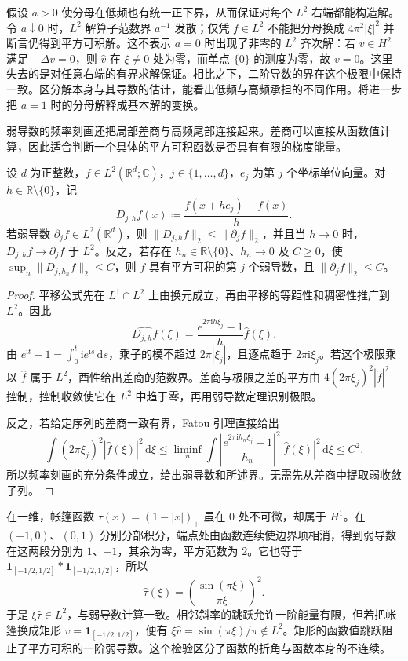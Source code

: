 假设 \(a>0\) 使分母在低频也有统一正下界，从而保证对每个 \(L^2\) 右端都能构造解。令 \(a\downarrow0\) 时，\(L^2\) 解算子范数界 \(a^{-1}\) 发散；仅凭 \(f\in L^2\) 不能把分母换成 \(4\pi^2|\xi|^2\) 并断言仍得到平方可积解。这不表示 \(a=0\) 时出现了非零的 \(L^2\) 齐次解：若 \(v\in H^2\) 满足 \(-\Delta v=0\)，则 \(\widehat v\) 在 \(\xi\ne0\) 处为零，而单点 \(\{0\}\) 的测度为零，故 \(v=0\)。这里失去的是对任意右端的有界求解保证。相比之下，二阶导数的界在这个极限中保持一致。区分解本身与其导数的估计，能看出低频与高频承担的不同作用。将进一步把 \(a=1\) 时的分母解释成基本解的变换。

\ProseParagraphBreak

弱导数的频率刻画还把局部差商与高频尾部连接起来。差商可以直接从函数值计算，因此适合判断一个具体的平方可积函数是否具有有限的梯度能量。

\begin{proposition}[平方范数差商]\label{b2:prop:04-difference-quotients}
设 \(d\) 为正整数，\(f\in L^2(\mathbb R^d;\mathbb C)\)，\(j\in\{1,\ldots,d\}\)，\(e_j\) 为第 \(j\) 个坐标单位向量。对 \(h\in\mathbb R\setminus\{0\}\)，记
\[
 D_{j,h}f(x)\coloneqq\frac{f(x+he_j)-f(x)}h.
\]
若弱导数 \(\partial_jf\in L^2(\mathbb R^d)\)，则 \(\|D_{j,h}f\|_2\leq\|\partial_jf\|_2\)，并且当 \(h\to0\) 时，\(D_{j,h}f\to\partial_jf\) 于 \(L^2\)。反之，若存在 \(h_n\in\mathbb R\setminus\{0\}\)、\(h_n\to0\) 及 \(C\geq0\)，使 \(\sup_n\|D_{j,h_n}f\|_2\leq C\)，则 \(f\) 具有平方可积的第 \(j\) 个弱导数，且 \(\|\partial_jf\|_2\leq C\)。
\end{proposition}
\begin{proof}
平移公式先在 \(L^1\cap L^2\) 上由换元成立，再由平移的等距性和稠密性推广到 \(L^2\)。因此
\[
 \widehat {D_{j,h}f}(\xi)
 =\frac{e^{2\pi\mathrm{i}h\xi_j}-1}{h}\widehat f(\xi).
\]
由 \(e^{\mathrm{i}t}-1=\int_0^t\mathrm{i}e^{\mathrm{i}s}\,\mathrm{d}s\)，乘子的模不超过 \(2\pi|\xi_j|\)，且逐点趋于 \(2\pi\mathrm{i}\xi_j\)。若这个极限乘以 \(\widehat f\) 属于 \(L^2\)，酉性给出差商的范数界。差商与极限之差的平方由 \(4(2\pi\xi_j)^2|\widehat f|^2\) 控制，控制收敛使它在 \(L^2\) 中趋于零，再用弱导数定理识别极限。

反之，若给定序列的差商一致有界，Fatou 引理直接给出
\[
 \int(2\pi\xi_j)^2|\widehat f(\xi)|^2\,\mathrm{d}\xi
 \leq\liminf_n\int\left|\frac{e^{2\pi\mathrm{i}h_n\xi_j}-1}{h_n}\right|^2
       |\widehat f(\xi)|^2\,\mathrm{d}\xi\leq C^2.
\]
所以频率刻画的充分条件成立，给出弱导数和所述界。无需先从差商中提取弱收敛子列。
\end{proof}

在一维，帐篷函数 \(\tau(x)=(1-|x|)_+\) 虽在 \(0\) 处不可微，却属于 \(H^1\)。在 \((-1,0)\)、\((0,1)\) 分别分部积分，端点处由函数连续使边界项相消，得到弱导数在这两段分别为 \(1\)、\(-1\)，其余为零，平方范数为 \(2\)。它也等于 \(\mathbf1_{[-1/2,1/2]}*\mathbf1_{[-1/2,1/2]}\)，所以
\[
 \widehat\tau(\xi)=\left(\frac{\sin(\pi\xi)}{\pi\xi}\right)^2.
\]
于是 \(\xi\widehat\tau\in L^2\)，与弱导数计算一致。相邻斜率的跳跃允许一阶能量有限，但若把帐篷换成矩形 \(v=\mathbf1_{[-1/2,1/2]}\)，便有 \(\xi\widehat v=\sin(\pi\xi)/\pi\notin L^2\)。矩形的函数值跳跃阻止了平方可积的一阶弱导数。这个检验区分了函数的折角与函数本身的不连续。

